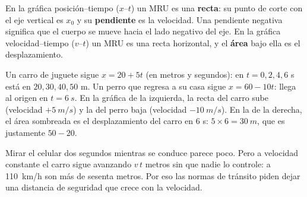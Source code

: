 \documentclass[11pt]{article}
\begin{document}
En la gráfica posición--tiempo ($x$--$t$) un MRU es una \textbf{recta}: su punto de corte con
el eje vertical es $x_0$ y su \textbf{pendiente} es la velocidad. Una pendiente negativa
significa que el cuerpo se mueve hacia el lado negativo del eje. En la gráfica
velocidad--tiempo ($v$--$t$) un MRU es una recta horizontal, y el \textbf{área} bajo ella es el
desplazamiento.

\begin{ejemplo}
Un carro de juguete sigue $x = 20 + 5t$ (en metros y segundos): en $t = 0, 2, 4, 6$ s está en
$20, 30, 40, 50$ m. Un perro que regresa a su casa sigue $x = 60 - 10t$: llega al origen en
$t = \qty{6}{s}$. En la gráfica de la izquierda, la recta del carro sube (velocidad
$+\qty{5}{m/s}$) y la del perro baja (velocidad $\qty{-10}{m/s}$). En la de la derecha, el
área sombreada es el desplazamiento del carro en 6 s: $5 \times 6 = \qty{30}{m}$, que es
justamente $50 - 20$.

\begin{center}
\hfill
{}
\end{center}
\end{ejemplo}

\begin{aplicacion}
Mirar el celular dos segundos mientras se conduce parece poco. Pero a velocidad constante el
carro sigue avanzando $v\,t$ metros sin que nadie lo controle: a \qty{110}{km/h} son más de
sesenta metros. Por eso las normas de tránsito piden dejar una distancia de seguridad que
crece con la velocidad.
\end{aplicacion}
\end{document}
